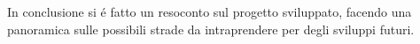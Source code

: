 In conclusione si \'e fatto un resoconto sul progetto sviluppato, facendo una panoramica sulle possibili strade
da intraprendere per degli sviluppi futuri.
